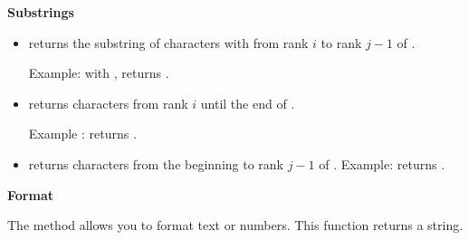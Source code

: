 \documentclass[11pt,class=report,crop=false]{standalone}
\begin{document}
\bigskip

\textbf{Substrings}

\begin{itemize}
  \item {}\quad returns the substring of characters with from rank $i$ to rank $j-1$ of .
  
   Example: with ,  returns .
   
  \item {}\quad returns characters from rank $i$ until the end of . 
  
  Example :
   returns .
  
  \item{}\quad returns characters from the beginning to rank $j-1$ of . Example:  returns .
  
\end{itemize}


\bigskip
\textbf{Format}

The  method allows you to format text or numbers. This function returns a string.
\end{document}
